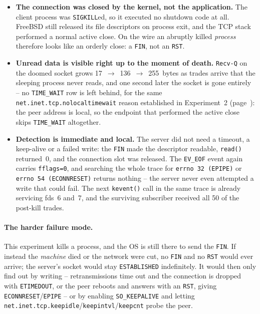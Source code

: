 \documentclass[11pt,a4paper]{article}
\begin{document}
\begin{itemize}[leftmargin=1.4em,itemsep=2pt]
\item \textbf{The connection was closed by the kernel, not the application.}  The client
      process was \texttt{SIGKILL}ed, so it executed no shutdown code at all.  FreeBSD
      still released its file descriptors on process exit, and the TCP stack performed a
      normal active close.  On the wire an abruptly killed \emph{process} therefore looks
      like an orderly close: a \texttt{FIN}, not an \texttt{RST}.
\item \textbf{Unread data is visible right up to the moment of death.}  \texttt{Recv-Q}
      on the doomed socket grows 17~$\rightarrow$~136~$\rightarrow$~255~bytes as trades
      arrive that the sleeping process never reads, and one second later the socket is
      gone entirely -- no \texttt{TIME\_WAIT} row is left behind, for the same
      \texttt{net.inet.tcp.nolocaltimewait} reason established in Experiment~2
      (page~\pageref{fig:e2b}): the peer address is local, so the endpoint that performed
      the active close skips \texttt{TIME\_WAIT} altogether.
\item \textbf{Detection is immediate and local.}  The server did not need a timeout, a
      keep-alive or a failed write: the \texttt{FIN} made the descriptor readable,
      \texttt{read()} returned~0, and the connection slot was released.  The
      \texttt{EV\_EOF} event again carries \texttt{fflags=0}, and searching the whole
      trace for \texttt{errno 32 (EPIPE)} or \texttt{errno 54 (ECONNRESET)} returns
      nothing -- the server never even attempted a write that could fail.  The next
      \texttt{kevent()} call in the same trace is already servicing fds~6 and~7, and the
      surviving subscriber received all 50 of the post-kill trades.
\end{itemize}

\paragraph{The harder failure mode.}  This experiment kills a process, and the OS is
still there to send the \texttt{FIN}.  If instead the \emph{machine} died or the network
were cut, no \texttt{FIN} and no \texttt{RST} would ever arrive; the server's socket
would stay \texttt{ESTABLISHED} indefinitely.  It would then only find out by writing --
retransmissions time out and the connection is dropped with \texttt{ETIMEDOUT}, or the
peer reboots and answers with an \texttt{RST}, giving \texttt{ECONNRESET}/\texttt{EPIPE}
-- or by enabling \texttt{SO\_KEEPALIVE} and letting
\texttt{net.inet.tcp.keepidle}/\texttt{keepintvl}/\texttt{keepcnt} probe the peer.
\end{document}
